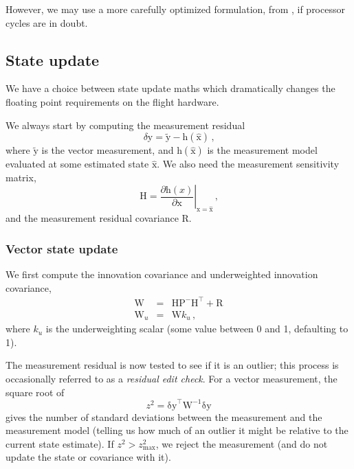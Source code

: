 \documentclass[12pt]{article}
\begin{document}
However, we may use a more carefully optimized formulation, from \cite{DSouza2011}, if processor cycles are in doubt.

\subsection{State update}

We have a choice between state update maths which dramatically changes the floating point requirements on the flight hardware.

We always start by computing the measurement residual
\begin{equation}
\delta\mathrm{y} = \tilde{\mathrm{y}} - \mathrm{h}(\hat{\mathrm{x}})\,\text{,}
\end{equation}
where $\tilde{\mathrm{y}}$ is the vector measurement, and $\mathrm{h}(\hat{\mathrm{x}})$ is the measurement model evaluated at some estimated state $\hat{\mathrm{x}}$. We also need the measurement sensitivity matrix,
\begin{equation}
\mathrm{H} = \left. \frac{\partial \mathrm{h}(x)}{\partial \mathrm{x}}\right|_{\mathrm{x} = \hat{\mathrm{x}}}\,\text{,}
\end{equation}
and the measurement residual covariance $\mathrm{R}$.

\subsubsection{Vector state update}

We first compute the innovation covariance and underweighted innovation covariance,
\begin{eqnarray}
\mathrm{W} &=& \mathrm{H}\mathrm{P}^{-}\mathrm{H}^\top + \mathrm{R} \\
\mathrm{W}_u &=& \mathrm{W}k_u\,\text{,}
\end{eqnarray}
where $k_u$ is the underweighting scalar (some value between 0 and 1, defaulting to 1).

The measurement residual is now tested to see if it is an outlier; this process is occasionally referred to as a \textit{residual edit check}. For a vector measurement, the square root of
\begin{equation}
z^2 = \mathrm{\delta y}^\top \mathrm{W}^{-1} \mathrm{\delta y} \label{eq:vector_residual_edit_check}
\end{equation}
gives the number of standard deviations between the measurement and the measurement model (telling us how much of an outlier it might be relative to the current state estimate). If $z^2 > z_\text{max}^2$, we reject the measurement (and do not update the state or covariance with it).
\end{document}
